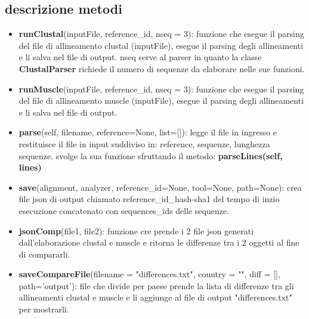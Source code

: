 \documentclass[11pt,italian]{article}
\begin{document}
	\subsection{descrizione metodi}
	\begin{itemize}
\item 	\textbf{runClustal}(inputFile, reference\_id, nseq = 3): funzione che esegue il parsing del file di allineamento clustal (inputFile), esegue il parsing degli allineamenti e li salva nel file di output. \newline nseq serve al parser in quanto la classe \textbf{ClustalParser} richiede il numero di sequenze da elaborare nelle sue funzioni.
\item		\textbf{runMuscle}(inputFile, reference\_id, nseq = 3): funzione che esegue il parsing del file di allineamento muscle (inputFile), esegue il parsing degli allineamenti e li salva nel file di output. \newline
\item		\textbf{parse}(self, filename, reference=None, list=[]):  legge il file in ingresso e restituisce il file in input suddiviso in: reference, sequenze, lunghezza sequenze.
	svolge la sua funzione sfruttando il metodo: \textbf{parseLines(self, lines)}
\item		\textbf{save}(alignment, analyzer, reference\_id=None, tool=None, path=None): crea file json di output chiamato reference\_id\_hash-sha1 del tempo di inzio esecuzione concatenato con sequences\_ids delle sequenze.

\item		\textbf{jsonComp}(file1, file2): funzione cre prende i 2 file json generati dall'elaborazione clustal e muscle e ritorna le differenze tra i 2 oggetti al fine di compararli.

\item		\textbf{saveCompareFile}(filename = "differences.txt", country = "", diff = [], path='output'): file che divide per paese prende la lista di differenze tra gli allineamenti clustal e muscle e li aggiunge al file di output "differences.txt" per mostrarli.

	\end{itemize}
\end{document}
